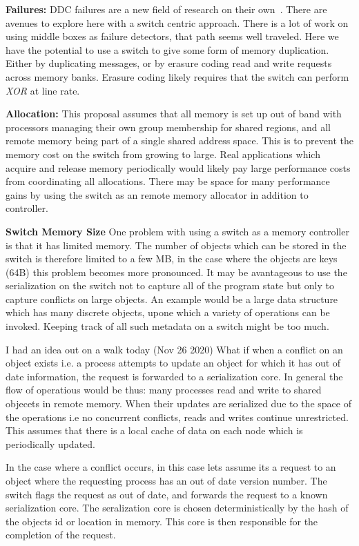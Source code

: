 \textbf{Failures:}
DDC failures are a new field of research on their
own~\cite{amanda-hotnets}. There are avenues to explore here with a
switch centric approach. There is a lot of work on using middle boxes
as failure detectors, that path seems well traveled. Here we have the
potential to use a switch to give some form of memory duplication.
Either by duplicating messages, or by erasure coding read and write
requests across memory banks. Erasure coding likely requires that the
switch can perform \textit{XOR} at line rate.

\textbf{Allocation:}
This proposal assumes that all memory is set up out of band with
processors managing their own group membership for shared regions, and
all remote memory being part of a single shared address space. This is
to prevent the memory cost on the switch from growing to large. Real
applications which acquire and release memory periodically would likely
pay large performance costs from coordinating all allocations. There
may be space for many performance gains by using the switch as an
remote memory allocator in addition to controller.

\textbf{Switch Memory Size}
One problem with using a switch as a memory controller is that it has
limited memory. The number of objects which can be stored in the
switch is therefore limited to a few MB, in the case where the objects
are keys (64B) this problem becomes more pronounced. It may be
avantageous to use the serialization on the switch not to capture all
of the program state but only to capture conflicts on large objects.
An example would be a large data structure which has many discrete
objects, upone which a variety of operations can be invoked. Keeping
track of all such metadata on a switch might be too much.

I had an idea out on a walk today (Nov 26 2020) What if when a
conflict on an object exists i.e. a process attempts to update an
object for which it has out of date information, the request is
forwarded to a serialization core. In general the flow of operatious
would be thus: many processes read and write to shared objecets in
remote memory. When their updates are serialized due to the space of
the operations i.e no concurrent conflicts, reads and writes continue
unrestricted. This assumes that there is a local cache of data on each
node which is periodically updated. 

In the case where a conflict occurs, in this case lets assume its a
request to an object where the requesting process has an out of date
version number. The switch flags the request as out of date, and
forwards the request to a known serialization core. The seralization
core is chosen deterministically by the hash of the objects id or
location in memory. This core is then responsible for the completion
of the request. 

